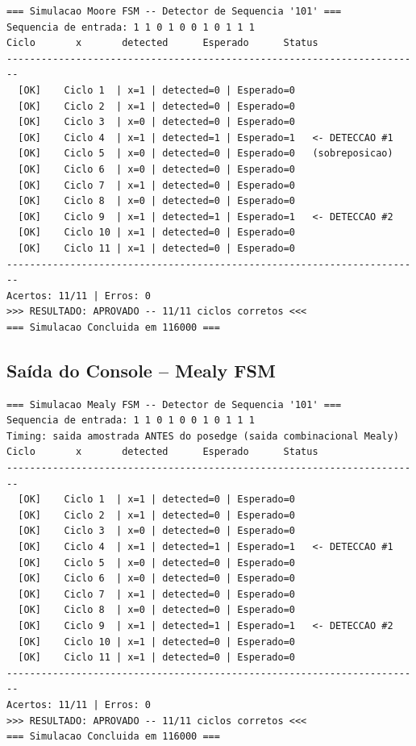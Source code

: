 \documentclass[12pt,a4paper]{article}
\begin{document}
\begin{lstlisting}[language={},
  caption={Log de simulação -- Moore FSM (11/11 ciclos corretos)},
  label={lst:log_moore},
  numbers=none, frame=single, backgroundcolor=\color{cinzaclaro}]
=== Simulacao Moore FSM -- Detector de Sequencia '101' ===
Sequencia de entrada: 1 1 0 1 0 0 1 0 1 1 1
Ciclo       x       detected      Esperado      Status
------------------------------------------------------------------------
  [OK]    Ciclo 1  | x=1 | detected=0 | Esperado=0
  [OK]    Ciclo 2  | x=1 | detected=0 | Esperado=0
  [OK]    Ciclo 3  | x=0 | detected=0 | Esperado=0
  [OK]    Ciclo 4  | x=1 | detected=1 | Esperado=1   <- DETECCAO #1
  [OK]    Ciclo 5  | x=0 | detected=0 | Esperado=0   (sobreposicao)
  [OK]    Ciclo 6  | x=0 | detected=0 | Esperado=0
  [OK]    Ciclo 7  | x=1 | detected=0 | Esperado=0
  [OK]    Ciclo 8  | x=0 | detected=0 | Esperado=0
  [OK]    Ciclo 9  | x=1 | detected=1 | Esperado=1   <- DETECCAO #2
  [OK]    Ciclo 10 | x=1 | detected=0 | Esperado=0
  [OK]    Ciclo 11 | x=1 | detected=0 | Esperado=0
------------------------------------------------------------------------
Acertos: 11/11 | Erros: 0
>>> RESULTADO: APROVADO -- 11/11 ciclos corretos <<<
=== Simulacao Concluida em 116000 ===
\end{lstlisting}

\subsection{Saída do Console -- Mealy FSM}

\begin{lstlisting}[language={},
  caption={Log de simulação -- Mealy FSM (11/11 ciclos corretos)},
  label={lst:log_mealy},
  numbers=none, frame=single, backgroundcolor=\color{cinzaclaro}]
=== Simulacao Mealy FSM -- Detector de Sequencia '101' ===
Sequencia de entrada: 1 1 0 1 0 0 1 0 1 1 1
Timing: saida amostrada ANTES do posedge (saida combinacional Mealy)
Ciclo       x       detected      Esperado      Status
------------------------------------------------------------------------
  [OK]    Ciclo 1  | x=1 | detected=0 | Esperado=0
  [OK]    Ciclo 2  | x=1 | detected=0 | Esperado=0
  [OK]    Ciclo 3  | x=0 | detected=0 | Esperado=0
  [OK]    Ciclo 4  | x=1 | detected=1 | Esperado=1   <- DETECCAO #1
  [OK]    Ciclo 5  | x=0 | detected=0 | Esperado=0
  [OK]    Ciclo 6  | x=0 | detected=0 | Esperado=0
  [OK]    Ciclo 7  | x=1 | detected=0 | Esperado=0
  [OK]    Ciclo 8  | x=0 | detected=0 | Esperado=0
  [OK]    Ciclo 9  | x=1 | detected=1 | Esperado=1   <- DETECCAO #2
  [OK]    Ciclo 10 | x=1 | detected=0 | Esperado=0
  [OK]    Ciclo 11 | x=1 | detected=0 | Esperado=0
------------------------------------------------------------------------
Acertos: 11/11 | Erros: 0
>>> RESULTADO: APROVADO -- 11/11 ciclos corretos <<<
=== Simulacao Concluida em 116000 ===
\end{lstlisting}
\end{document}
